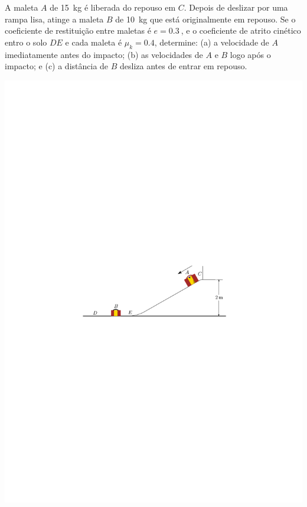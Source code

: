 \item A maleta $A$ de \SI{15}{\kilogram} é liberada do repouso em $C$. Depois de deslizar por uma rampa lisa, atinge a maleta $B$ de \SI{10}{\kilogram} que está originalmente em repouso. Se o coeficiente de restituição entre maletas é $e=\SI{0.3}{}$, e o coeficiente de atrito cinético entro o solo $DE$ e cada maleta é $\mu_{k}=0.4$, determine: (a) a velocidade de $A$ imediatamente antes do impacto; (b) as velocidades de $A$ e $B$ logo após o impacto; e (c) a distância de $B$ desliza antes de entrar em repouso.

\begin{flushright}
	\includegraphics[scale=1.3]{images/draw_10}
\end{flushright}